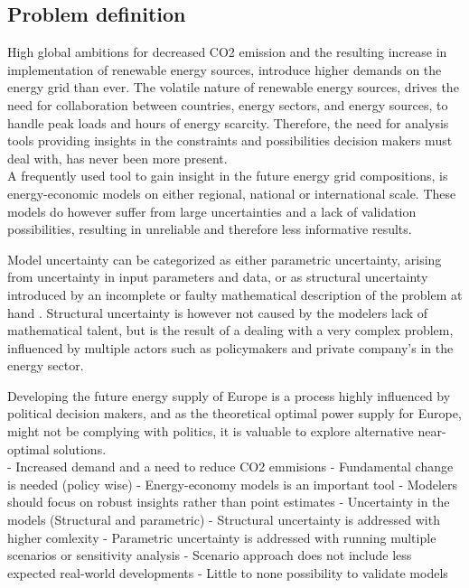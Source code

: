 
\subsection{Problem definition}

High global ambitions for decreased CO2 emission and the resulting increase in implementation of renewable energy sources, introduce higher demands on the energy grid than ever. The volatile nature of renewable energy sources, drives the need for collaboration between countries, energy sectors, and energy sources, to handle peak loads and hours of energy scarcity. Therefore, the need for analysis tools providing insights in the constraints and possibilities decision makers must deal with, has never been more present.  \\

A frequently used tool to gain insight in the future energy grid compositions, is energy-economic models on either regional, national or international scale. These models do however suffer from large uncertainties and a lack of validation possibilities, resulting in unreliable and therefore less informative results. 

Model uncertainty can be categorized as either parametric uncertainty, arising from uncertainty in input parameters and data, or as structural uncertainty introduced by an incomplete or faulty mathematical description of the problem at hand \cite{DeCarolis_MGA}. Structural uncertainty is however not caused by the modelers lack of mathematical talent, but is the result of a dealing with a very complex problem, influenced by multiple actors such as policymakers and private company's in the energy sector. 



Developing the future energy supply of Europe is a process highly influenced by political decision makers, and as the theoretical optimal power supply for Europe, might not be complying with politics, it is valuable to explore alternative near-optimal solutions. \\

- Increased demand and a need to reduce CO2 emmisions 
- Fundamental change is needed (policy wise)
- Energy-economy models is an important tool 
- Modelers should focus on robust insights rather than point estimates
- Uncertainty in the models (Structural and parametric)
- Structural uncertainty is addressed with higher comlexity
- Parametric uncertainty is addressed with running multiple scenarios or sensitivity analysis
- Scenario approach does not include less expected real-world developments 
- Little to none possibility to validate models 



